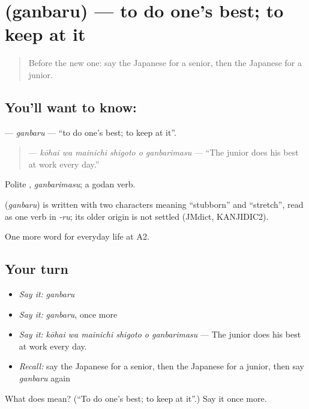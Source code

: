 \section[\texorpdfstring{\ja{がんばる} (ganbaru)}{がんばる (ganbaru)}]{ (ganbaru) — to do one's best; to keep at it}

\label{lesson:JA-C230-ganbaru}



\begin{quote}
Before the new one: say the Japanese for a senior, then the Japanese for a junior.
\end{quote}

\subsection*{You'll want to know: }
\textbf{} — \emph{ganbaru} — \textquotedblleft{}to do one's best; to keep at it\textquotedblright{}.

\begin{quote}
\textbf{   } — \emph{kōhai wa mainichi shigoto o ganbarimasu} — \textquotedblleft{}The junior does his best at work every day.\textquotedblright{}
\end{quote}

Polite \textbf{}, \emph{ganbarimasu}; a godan verb.

\begin{cousinweb}
\textbf{} (\emph{ganbaru}) is written with two characters meaning \textquotedblleft{}stubborn\textquotedblright{} and \textquotedblleft{}stretch\textquotedblright{}, read as one verb in \emph{-ru}; its older origin is not settled (JMdict, KANJIDIC2).
\end{cousinweb}

\begin{grammarlens}[title={What you've built}]
One more word for everyday life at A2.
\end{grammarlens}

\subsection*{Your turn}
\begin{itemize}
\raggedright
  \item \emph{Say it:} \emph{ganbaru}
  \item \emph{Say it:} \emph{ganbaru}, once more
  \item \emph{Say it:} \emph{kōhai wa mainichi shigoto o ganbarimasu} — The junior does his best at work every day.
  \item \emph{Recall:} say the Japanese for a senior, then the Japanese for a junior, then say \emph{ganbaru} again
\end{itemize}

\begin{tcolorbox}[breakable,colback=teal!4,colframe=teal!35!black,title={Before you move on}]
What does  mean? (\textquotedblleft{}To do one's best; to keep at it\textquotedblright{}.) Say it once more.
\end{tcolorbox}
